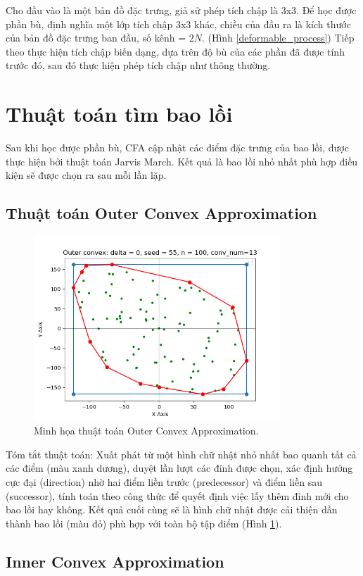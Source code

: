 \documentclass[12pt,a4paper,openany,oneside]{report}
\begin{document}
Cho đầu vào là một bản đồ đặc trưng, giả sử phép tích chập là 3x3. Để học được phần bù, định nghĩa một lớp tích chập 3x3 khác, chiều của đầu ra là kích thước của bản đồ đặc trưng ban đầu, số kênh = $2N$. (Hình \ref{deformable_process}) Tiếp theo thực hiện tích chập biến dạng, dựa trên độ bù của các phần đã được tính trước đó, sau đó thực hiện phép tích chập như thông thường.
\section{Thuật toán tìm bao lồi}
Sau khi học được phần bù, CFA cập nhật các điểm đặc trưng của bao lồi, được thực hiện bởi thuật toán Jarvis March. Kết quả là bao lồi nhỏ nhất phù hợp điều kiện sẽ được chọn ra sau mỗi lần lặp.
\subsection{Thuật toán Outer Convex Approximation}
\begin{figure}[ht!]
	\begin{center}
		\includegraphics[width=350px]{./outer_convex_approximation_brief.png}
		\caption{Minh họa thuật toán Outer Convex Approximation.}
		\label{outer_convex_approximation_brief}
	\end{center}
\end{figure} 
Tóm tắt thuật toán: Xuất phát từ một hình chữ nhật nhỏ nhất bao quanh tất cả các điểm (màu xanh dương), duyệt lần lượt các đỉnh được chọn, xác định hướng cực đại (direction) nhờ hai điểm liền trước (predecessor) và điểm liền sau (successor), tính toán theo công thức để quyết định việc lấy thêm đỉnh mới cho bao lồi hay không. Kết quả cuối cùng sẽ là hình chữ nhật được cải thiện dần thành bao lồi (màu đỏ) phù hợp với toàn bộ tập điểm (Hình \ref{outer_convex_approximation_brief}). 
\subsection{Inner Convex Approximation}
\end{document}

